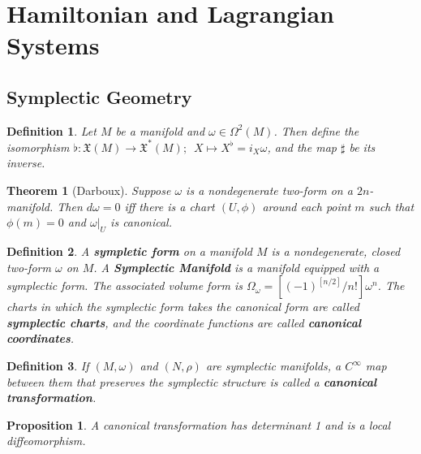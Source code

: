 \documentclass{article}
\newtheorem{thm}{Theorem}
\newtheorem{defn}{Definition}
\newtheorem{prop}{Proposition}
\begin{document}
\section{Hamiltonian and Lagrangian Systems}

\subsection{Symplectic Geometry}

\begin{defn}

Let $M$ be a manifold and $\omega \in \Omega^2(M) $. Then define the isomorphism $ \flat: \mathfrak{X}(M) \to \mathfrak{X}^* (M); \hspace{6pt} X \mapsto X^{\flat} = i_X \omega$, and the map $\sharp$ be its inverse.

\end{defn}
\begin{thm}[Darboux]
Suppose $\omega$ is a nondegenerate two-form on a $2n$-manifold. Then $d\omega = 0$ iff there is a chart $(U, \phi)$ around each point $m$ such that $\phi(m) = 0$ and $\omega\vert_U$ is canonical.
\end{thm}

\begin{defn}
A \textbf{sympletic form} on a manifold $M$ is a nondegenerate, closed two-form $\omega$ on $M$. A \textbf{Symplectic Manifold} is a manifold equipped with a symplectic form. The associated volume form is $\Omega_{\omega} = [(-1)^{[n/2]}/n!]\omega^n$. The charts in which the symplectic form takes the canonical form are called \textbf{symplectic charts}, and the coordinate functions are called \textbf{canonical coordinates}.
\end{defn}

\begin{defn}

If $(M,\omega)$ and $(N, \rho)$ are symplectic manifolds, a $C^{\infty}$ map between them that preserves the symplectic structure is called a \textbf{canonical transformation}.

\end{defn}

\begin{prop}

A canonical transformation has determinant 1 and is a local diffeomorphism.

\end{prop}
\end{document}
